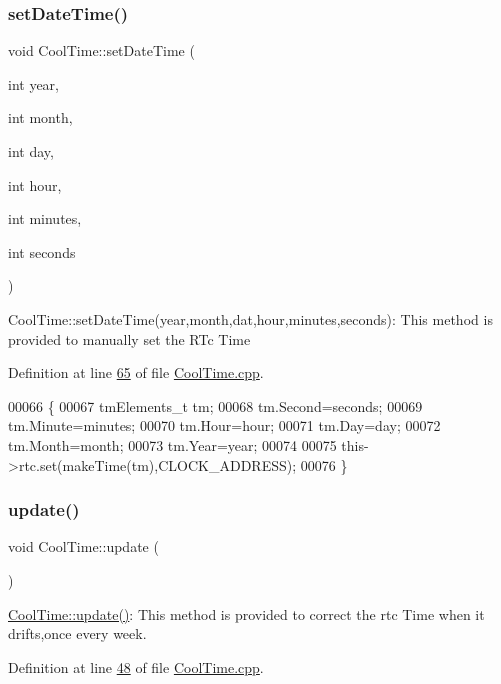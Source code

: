 \subsubsection{\texorpdfstring{set\+Date\+Time()}{setDateTime()}}
{\footnotesize\ttfamily void Cool\+Time\+::set\+Date\+Time (\begin{DoxyParamCaption}\item[{int}]{year,  }\item[{int}]{month,  }\item[{int}]{day,  }\item[{int}]{hour,  }\item[{int}]{minutes,  }\item[{int}]{seconds }\end{DoxyParamCaption})}

Cool\+Time\+::set\+Date\+Time(year,month,dat,hour,minutes,seconds)\+: This method is provided to manually set the R\+Tc Time 

Definition at line \hyperlink{_cool_time_8cpp_source_l00065}{65} of file \hyperlink{_cool_time_8cpp_source}{Cool\+Time.\+cpp}.


\begin{DoxyCode}
00066 \{ 
00067     tmElements\_t tm;
00068     tm.Second=seconds; 
00069     tm.Minute=minutes; 
00070     tm.Hour=hour; 
00071     tm.Day=day;
00072     tm.Month=month; 
00073     tm.Year=year;   
00074 
00075     this->rtc.set(makeTime(tm),CLOCK\_ADDRESS);
00076 \}
\end{DoxyCode}
\mbox{\label{class_cool_time_aae601f795452cfa48d9fb337aed483a8}} 
\subsubsection{\texorpdfstring{update()}{update()}}
{\footnotesize\ttfamily void Cool\+Time\+::update (\begin{DoxyParamCaption}{ }\end{DoxyParamCaption})}

\hyperlink{class_cool_time_aae601f795452cfa48d9fb337aed483a8}{Cool\+Time\+::update()}\+: This method is provided to correct the rtc Time when it drifts,once every week. 

Definition at line \hyperlink{_cool_time_8cpp_source_l00048}{48} of file \hyperlink{_cool_time_8cpp_source}{Cool\+Time.\+cpp}.



